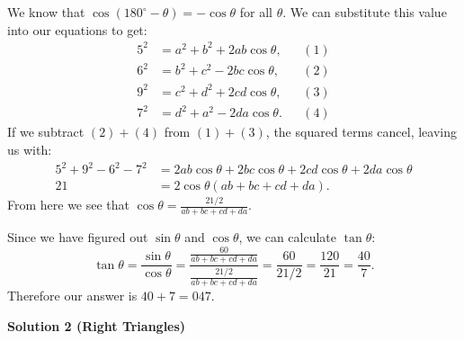 \begin{enumerate}
We know that $\cos (180^\circ - \theta) = -\cos \theta$ for all $\theta$. We can substitute this value into our equations to get:
 \begin{align*}   5^2 &= a^2 + b^2 + 2ab\cos \theta, &&(1) \\   6^2 &= b^2 + c^2 - 2bc\cos \theta, &&(2) \\   9^2 &= c^2 + d^2 + 2cd\cos \theta, &&(3) \\   7^2 &= d^2 + a^2 - 2da\cos \theta. &&(4) \end{align*}
If we subtract $(2)+(4)$ from $(1)+(3)$, the squared terms cancel, leaving us with:
 \begin{align*} 5^2 + 9^2 - 6^2 - 7^2 &= 2ab \cos \theta + 2bc \cos \theta + 2cd \cos \theta + 2da \cos \theta \\  21 &= 2\cos \theta (ab  + bc + cd + da). \end{align*}
From here we see that $\cos \theta = \frac{21/2}{ab + bc + cd + da}$.

 Since we have figured out $\sin \theta$ and $\cos \theta$, we can calculate $\tan \theta$: 
 \[\tan \theta = \frac{\sin \theta}{\cos \theta} = \frac{\frac{60}{ab + bc + cd + da}}{\frac{21/2}{ab + bc + cd + da}} = \frac{60}{21/2} = \frac{120}{21} = \frac{40}{7}.\]Therefore our answer is $40 + 7 = \boxed{047}$.

 



\textbf{Solution 2 (Right Triangles)}


\end{enumerate}
